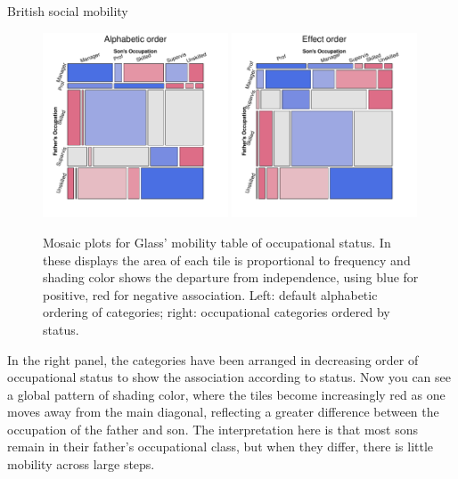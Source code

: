 \documentclass[10pt,krantz2]{krantz}\usepackage[]{graphicx}\usepackage[]{color}
\begin{document}
\begin{Example}[glass]{British social mobility}
\begin{figure}
  \centering
  \includegraphics[width=0.49\textwidth]{ch01/fig/glass-mosaic1}
  \hfill
  \includegraphics[width=0.49\textwidth]{ch01/fig/glass-mosaic2}
  \caption{Mosaic plots for Glass' mobility table of occupational status.
  In these displays the area of each tile is proportional to frequency
  and shading color shows the departure from independence, using
  blue for positive, red for negative association.
  Left: default alphabetic ordering of categories; right: occupational categories
  ordered by status. 
  }
  \label{fig:glass-mosaic}
\end{figure}
In the right panel, the categories have been arranged in
decreasing order of occupational status to show the
association according to status.
Now you can see a global pattern of shading color, where the
tiles become increasingly red as one moves away from the main
diagonal, reflecting a greater difference between the occupation
of the father and son.
The interpretation here is that most sons remain in their
father's occupational class, but when they differ,
there is little mobility across large steps.


\end{Example}
\end{document}
